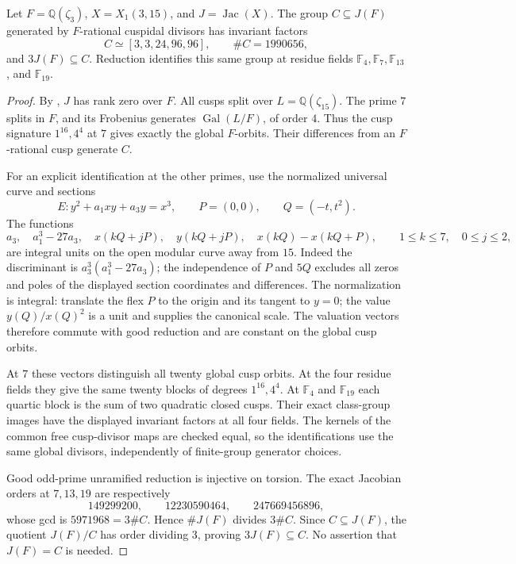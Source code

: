 \begin{lemma}\label{lem:octic-315-cusp-image}
Let $F=\mathbb Q(\zeta_3)$, $X=X_1(3,15)$, and
$J=\operatorname{Jac}(X)$. The group $C\subseteq J(F)$
generated by $F$-rational cuspidal divisors has invariant factors
\[
 C\simeq[3,3,24,96,96],\qquad \#C=1990656,
\]
and $3J(F)\subseteq C$. Reduction identifies this same group
at residue fields $\mathbb F_4,\mathbb F_7,\mathbb F_{13}$,
and $\mathbb F_{19}$.
\end{lemma}
\begin{proof}
By \cite[Theorem~4.1]{DS}, $J$ has rank zero over $F$.
All cusps split over $L=\mathbb Q(\zeta_{15})$.
The prime $7$ splits in $F$, and its Frobenius generates
$\operatorname{Gal}(L/F)$, of order $4$.
Thus the cusp signature $1^{16},4^4$ at $7$ gives exactly
the global $F$-orbits. Their differences from an $F$-rational
cusp generate $C$.

For an explicit identification at the other primes, use the
normalized universal curve and sections
\[
 E:y^2+a_1xy+a_3y=x^3,\qquad P=(0,0),\qquad Q=(-t,t^2).
\]
The functions
\[
 a_3,\quad a_1^3-27a_3,\quad
 x(kQ+jP),\quad y(kQ+jP),\quad
 x(kQ)-x(kQ+P),
 \qquad 1\leq k\leq7,\quad 0\leq j\leq2,
\]
are integral units on the open modular curve away from $15$.
Indeed the discriminant is $a_3^3(a_1^3-27a_3)$; the
independence of $P$ and $5Q$ excludes all zeros and poles
of the displayed section coordinates and differences.
The normalization is integral: translate the flex $P$ to
the origin and its tangent to $y=0$; the value
$y(Q)/x(Q)^2$ is a unit and supplies the canonical scale.
The valuation vectors therefore commute with good reduction
and are constant on the global cusp orbits.

At $7$ these vectors distinguish all twenty global cusp
orbits. At the four residue fields they give the same
twenty blocks of degrees $1^{16},4^4$. At $\mathbb F_4$
and $\mathbb F_{19}$ each quartic block is the sum of two
quadratic closed cusps. Their exact class-group images
have the displayed invariant factors at all four fields.
The kernels of the common free cusp-divisor maps are
checked equal, so the identifications use the same global
divisors, independently of finite-group generator choices.

Good odd-prime unramified reduction is injective on torsion.
The exact Jacobian orders at $7,13,19$ are respectively
\[
149299200,\qquad12230590464,\qquad247669456896,
\]
whose gcd is $5971968=3\#C$. Hence $\#J(F)$ divides
$3\#C$. Since $C\subseteq J(F)$, the quotient $J(F)/C$
has order dividing $3$, proving $3J(F)\subseteq C$.
No assertion that $J(F)=C$ is needed.
\end{proof}

